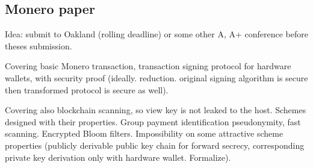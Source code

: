 \documentclass[
  digital, %
  twoside, %
  table,   %
  lof,     %
  lot,     %
]{fithesis3}
\theoremstyle{definition}
\theoremstyle{remark}
\begin{document}
\begin{ecmmnt}\subsection{Monero paper}

Idea: submit to Oakland (rolling deadline) or some other A, A+ conference before theses submission. 

Covering basic Monero transaction, transaction signing protocol for hardware wallets, with security proof (ideally. reduction. original signing algorithm is secure then transformed protocol is secure as well).

Covering also blockchain scanning, so view key is not leaked to the host. Schemes designed with their properties. Group payment identification pseudonymity, fast scanning. Encrypted Bloom filters. Impossibility on some attractive scheme properties (publicly derivable public key chain for forward secrecy, corresponding private key derivation only with hardware wallet. Formalize). 
\end{ecmmnt}
\end{document}
